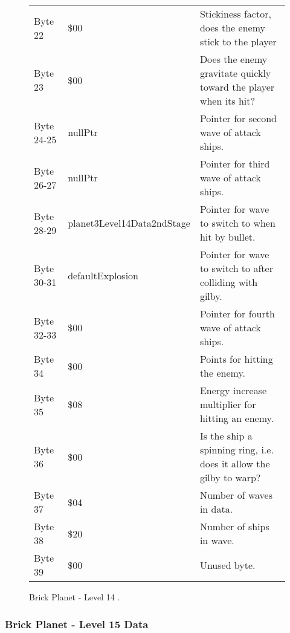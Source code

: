 \begin{figure}[H]
{\begin{adjustbox}{width=12cm}
\begin{tabular}{lll}
 Byte 22    & \$00                        & Stickiness factor, does the enemy stick to the player               \\
 Byte 23    & \$00                        & Does the enemy gravitate quickly toward the player when its hit?    \\
 Byte 24-25 & nullPtr                    & Pointer for second wave of attack ships.                            \\
 Byte 26-27 & nullPtr                    & Pointer for third wave of attack ships.                             \\
 Byte 28-29 & planet3Level14Data2ndStage & Pointer for wave to switch to when hit by bullet.                   \\
 Byte 30-31 & defaultExplosion           & Pointer for  wave to switch to after colliding with gilby.          \\
 Byte 32-33 & \$00                        & Pointer for fourth wave of attack ships.                            \\
 Byte 34    & \$00                        & Points for hitting the enemy.                                       \\
 Byte 35    & \$08                        & Energy increase multiplier for hitting an enemy.                    \\
 Byte 36    & \$00                        & Is the ship a spinning ring, i.e. does it allow the gilby to warp?  \\
 Byte 37    & \$04                        & Number of waves in data.                                            \\
 Byte 38    & \$20                        & Number of ships in wave.                                            \\
 Byte 39    & \$00                        & Unused byte.                                                        \\
\bottomrule
\end{tabular}

  \end{adjustbox}

  }\caption*{Brick Planet - Level 14
.}
\end{figure}

\clearpage
\subsubsection{Brick Planet - Level 15 Data}

